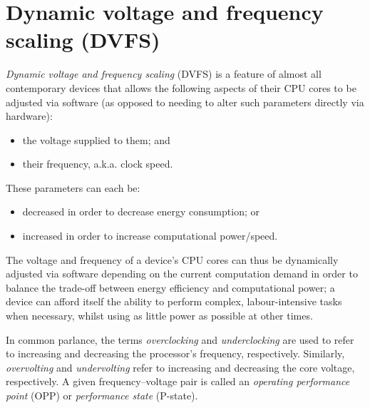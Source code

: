 \section{Dynamic voltage and frequency scaling (DVFS)}

\emph{Dynamic voltage and frequency scaling} (DVFS) is a feature of almost all
contemporary devices that allows the following aspects of their CPU cores to be
adjusted via software (as opposed to needing to alter such parameters directly
via hardware):
\begin{itemize}
    \item the voltage supplied to them; and
    \item their frequency, a.k.a. clock speed.
\end{itemize}

These parameters can each be:
\begin{itemize}
    \item decreased in order to decrease energy consumption; or
    \item increased in order to increase computational power/speed.
\end{itemize}

The voltage and frequency of a device's CPU cores can thus be dynamically
adjusted via software depending on the current computation demand in order to
balance the trade-off between energy efficiency and computational power; a
device can afford itself the ability to perform complex, labour-intensive tasks
when necessary, whilst using as little power as possible at other times.

In common parlance, the terms \emph{overclocking} and \emph{underclocking} are
used to refer to increasing and decreasing the processor's frequency,
respectively. Similarly, \emph{overvolting} and \emph{undervolting} refer to
increasing and decreasing the core voltage, respectively. A given
frequency–voltage pair is called an \emph{operating performance point} (OPP)
or \emph{performance state} (P-state).
